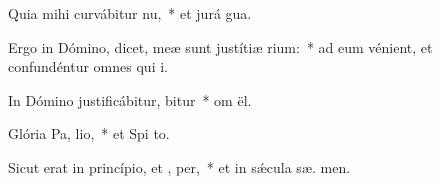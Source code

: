 \item Quia mihi curvábitur  nu,~* et jurá  gua.
\item Ergo in Dómino, dicet, meæ sunt justítiæ  rium:~* ad eum vénient, et confundéntur omnes qui  i.
\item In Dómino justificábitur,  bitur~* om  ël.
\item Glória Pa,  lio,~* et Spi to.
\item Sicut erat in princípio, et ,  per,~* et in sǽcula sæ. men.
